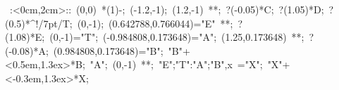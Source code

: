 %


\hbox{
\xy    <2cm,0cm>:<0cm,2cm>::
       (0,0) *\ellipse(1){-}; 
       (-1.2,-1); (1.2,-1) **\dir{-}; ?(-0.05)*{C}; ?(1.05)*{D};  ?(0.5)*^!/7pt/{T};
       (0,-1); (0.642788,0.766044)="E" **\dir{-};  ?(1.08)*{E}; (0,-1)="T";
       (-0.984808,0.173648)="A"; (1.25,0.173648) **\dir{-};  ?(-0.08)*{A};   (0.984808,0.173648)="B";
       "B"+<0.5em,1.3ex>*{B}; 
       "A"; (0,-1) **\dir{-}; {"E";"T":"A";"B",x} ="X"; "X"+<-0.3em,1.3ex>*{X};
\endxy}

